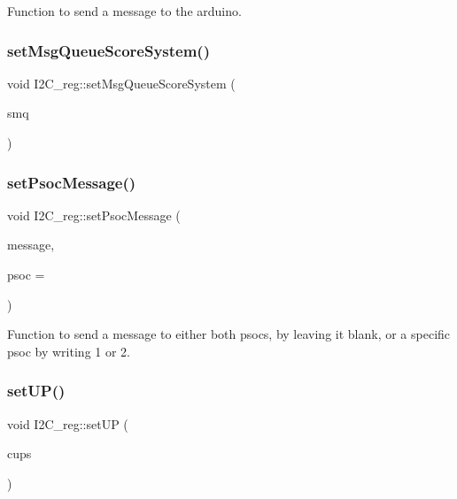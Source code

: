 Function to send a message to the arduino. 

\mbox{\label{class_i2_c__reg_a2893302d924b666bd1a91a4effe5ed9b}} 
\subsubsection{\texorpdfstring{set\+Msg\+Queue\+Score\+System()}{setMsgQueueScoreSystem()}}
{\footnotesize\ttfamily void I2\+C\+\_\+reg\+::set\+Msg\+Queue\+Score\+System (\begin{DoxyParamCaption}\item[{osapi\+::\+Msg\+Queue $\ast$}]{smq }\end{DoxyParamCaption})\hspace{0.3cm}{\ttfamily [inline]}}

\mbox{\label{class_i2_c__reg_a97310205f1e1fc2f53c43ac95c04d252}} 
\subsubsection{\texorpdfstring{set\+Psoc\+Message()}{setPsocMessage()}}
{\footnotesize\ttfamily void I2\+C\+\_\+reg\+::set\+Psoc\+Message (\begin{DoxyParamCaption}\item[{uint8\+\_\+t}]{message,  }\item[{uint8\+\_\+t}]{psoc = {} }\end{DoxyParamCaption})}



Function to send a message to either both psocs, by leaving it blank, or a specific psoc by writing 1 or 2. 

\mbox{\label{class_i2_c__reg_a2028790c3222d6ce7ae263b26919af20}} 
\subsubsection{\texorpdfstring{set\+U\+P()}{setUP()}}
{\footnotesize\ttfamily void I2\+C\+\_\+reg\+::set\+UP (\begin{DoxyParamCaption}\item[{int}]{cups }\end{DoxyParamCaption})}



